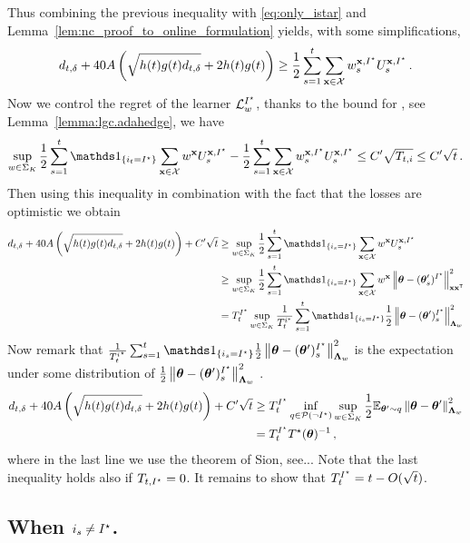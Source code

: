 Thus combining the previous inequality with \eqref{eq:only_istar} and Lemma~\ref{lem:nc_proof_to_online_formulation} yields, with some simplifications,
\begin{equation}
\label{eq:to_UCB}
d_{t,\delta} + 40 A\left(\sqrt{h(t)g(t) d_{t,\delta}}+ 2h(t)g(t)\right) \geq \frac{1}{2}\sum_{s=1}^t\sum_{{\bf x}\in\mathcal{X}} w_s^{{\bf x},I^\star}U_s^{{\bf x},I^\star}\,.
\end{equation}
Now we control the regret of the learner $\mathcal{L}_w^{I^\star}$, thanks to the bound for \AH, see Lemma~\ref{lemma:lgc.adahedge}, we have
\[
\sup_{w\in\Sigma_K}\frac{1}{2}\sum_{s=1}^t\ind_{\{i_t = \istar\}}\sum_{\bx\in\cX} w^{\bx}U_s^{\bx,\istar} -\frac{1}{2}\sum_{s=1}^t\sum_{\bx\in\cX} w_s^{\bx,\istar}U_s^{\bx,\istar} \leq C'\sqrt{T_{t,i}}\leq C'\sqrt{t}\,.
\]
Then using this inequality in combination with the fact that the losses are optimistic we obtain
\begin{align*}
  d_{t,\delta} + 40 A\left(\sqrt{h(t)g(t) d_{t,\delta}}+ 2h(t)g(t)\right) +C'\sqrt{t}
  &\geq \sup_{w\in\Sigma_K}\frac{1}{2}\sum_{s=1}^t\ind_{\{i_s = \istar\}}\sum_{\bx\in\cX} w^{\bx}U_s^{\bx,\istar}
  \\
  &\geq \sup_{w\in\Sigma_K}\frac{1}{2}\sum_{s=1}^t\ind_{\{i_s = \istar\}}\sum_{\bx\in\cX} w^{\bx} \normm{\btheta -(\btheta'_s)^{\istar}}^2_{\bx\bx\transpose}
  \\
  &= T^{\istar}_t \sup_{w\in\Sigma_K}\frac{1}{T^{i^*}_t}\sum_{s=1}^t\ind_{\{i_s = \istar\}}\frac{1}{2}\normm{\btheta -(\btheta')_s^{\istar}}^2_{\bLambda_{w}}
  \end{align*}
Now remark that $\frac{1}{T^{i^\star}_t}\sum_{s=1}^t\ind_{\{i_s = \istar\}}\frac{1}{2}\normm{\btheta -(\btheta')_s^{\istar}}^2_{\bLambda_{w}}$ is the expectation under some distribution of $\frac{1}{2}\left\lVert{\boldsymbol \theta} -({\boldsymbol \theta}')_s^{I^\star}\right\rVert^2_{{\boldsymbol \Lambda}_{w}}$ .
\begin{align*}
  d_{t,\delta} + 40 A\left(\sqrt{h(t)g(t) d_{t,\delta}}+ 2h(t)g(t)\right) +C'\sqrt{t}
  &\geq T^{I^\star}_t \inf_{q\in\mathcal{P}(\neg I^\star)} \sup_{w\in\Sigma_K}\frac{1}{2}\mathbb{E}_{{\boldsymbol \theta}'\sim q}\left\lVert{\boldsymbol \theta} -{\boldsymbol \theta}'\right\rVert^2_{{\boldsymbol \Lambda}_{w}}\\
 &=T^{I^\star}_t T^{\star}({\boldsymbol \theta})^{-1}\,,
\end{align*}
where in the last line we use the theorem of Sion, see...%
Note that the last inequality holds also if $T_{t,I^\star} = 0$. It remains to show that $T^{I^\star}_t = t- O(\sqrt{t})$.

\subsection{When $i_s \neq I^\star$.}

